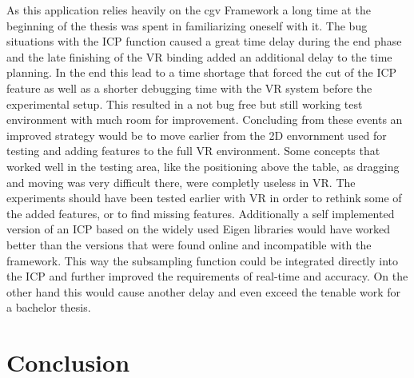 \documentclass[hyperref,english,bachelorofscience,bibnum]{cgvpub}
\begin{document}
As this application relies heavily on the cgv Framework a long time at the beginning of the thesis was spent in familiarizing oneself with it. The bug situations with the ICP function caused a great time delay during the end phase and the late finishing of the VR binding added an additional delay to the time planning. In the end this lead to a time shortage that forced the cut of the ICP feature as well as a shorter debugging time with the VR system before the experimental setup. This resulted in a not bug free but still working test environment with much room for improvement. Concluding from these events an improved strategy would be to move earlier from the 2D envornment used for testing and adding features to the full VR environment. Some concepts that worked well in the testing area, like the positioning above the table, as dragging and moving was very difficult there, were completly useless in VR. The experiments should have been tested earlier with VR in order to rethink some of the added features, or to find missing features. Additionally a self implemented version of an ICP based on the widely used Eigen libraries would have worked better than the versions that were found online and incompatible with the framework. This way the subsampling function could be integrated directly into the ICP and further improved the requirements of real-time and accuracy. On the other hand this would cause another delay and even exceed the tenable work for a bachelor thesis.


\chapter{Conclusion}
\end{document}
